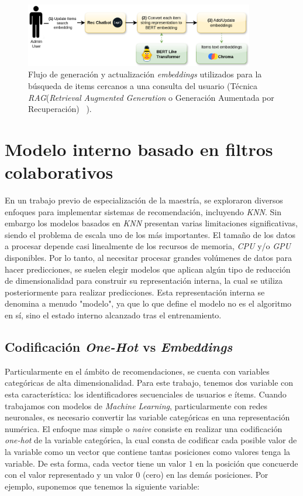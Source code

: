 \documentclass[11pt,a4paper,twoside]{thesis}
\begin{document}
\begin{figure}[H]
	\centering
	\label{fig:rag-update-flow}
	\includegraphics[width=10cm]{./images/rag-embedding-update.png}
	\caption{Flujo de generación y actualización \textit{embeddings} utilizados para la búsqueda de items cercanos a una consulta del usuario (Técnica \textit{RAG}(\textit{Retrieval Augmented Generation} o Generación Aumentada por Recuperación) ~\cite{rag}).}
\end{figure}

\chapter{Modelo interno basado en filtros colaborativos}

En un trabajo previo de especialización \cite{src} de la maestría, se exploraron diversos enfoques para implementar sistemas de recomendación, incluyendo \textit{KNN}. Sin embargo los modelos basados en \textit{KNN} presentan varias limitaciones significativas, siendo el problema de escala uno de los más importantes. El tamaño de los datos a procesar depende casi linealmente de los recursos de memoria, \textit{CPU} y/o \textit{GPU} disponibles. Por lo tanto, al necesitar procesar grandes volúmenes de datos para hacer predicciones, se suelen elegir modelos que aplican algún tipo de reducción de dimensionalidad para construir su representación interna, la cual se utiliza posteriormente para realizar predicciones. Esta representación interna se denomina a menudo "modelo", ya que lo que define el modelo no es el algoritmo en sí, sino el estado interno alcanzado tras el entrenamiento.

\section{Codificación \textit{One-Hot} vs \textit{Embeddings}}

Particularmente en el ámbito de recomendaciones, se cuenta con variables
categóricas de alta dimensionalidad. Para este trabajo, tenemos dos variable
con esta característica: los identificadores secuenciales de usuarios e ítems.
Cuando trabajamos con modelos de \textit{Machine Learning}, particularmente con
redes neuronales, es necesario convertir las variable categóricas en una
representación numérica. El enfoque mas simple o \textit{naive} consiste en
realizar una codificación \textit{one-hot} de la variable categórica, la cual
consta de codificar cada posible valor de la variable como un vector que
contiene tantas posiciones como valores tenga la variable. De esta forma, cada
vector tiene un valor $1$ en la posición que concuerde con el valor
representado y un valor $0$ (cero) en las demás posiciones. Por ejemplo,
suponemos que tenemos la siguiente variable:
\end{document}
